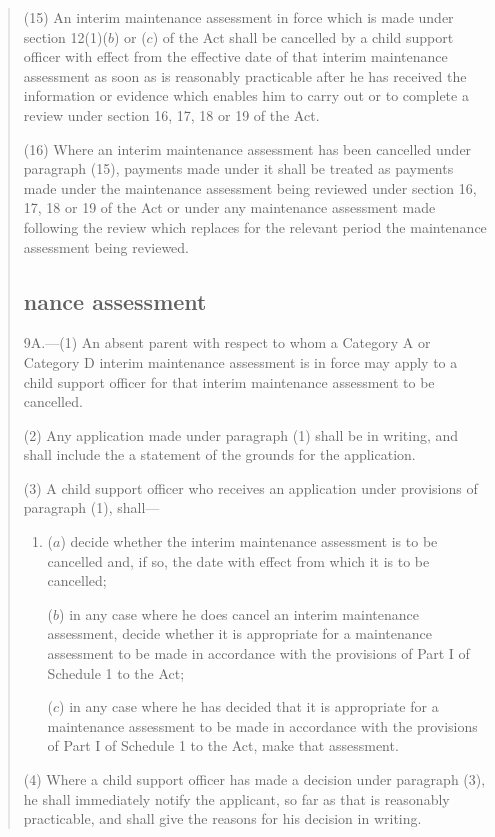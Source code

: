 \documentclass[12pt,a4paper]{article}
\begin{document}
\begin{quotation}
(15) An interim maintenance assessment in force which is made under section 12(1)($b$) or ($c$) of the Act shall be cancelled by a child support officer with effect from the effective date of that interim maintenance assessment as soon as is reasonably practicable after he has received the information or evidence which enables him to carry out or to complete a review under section 16, 17, 18 or 19 of the Act.

(16) Where an interim maintenance assessment has been cancelled under paragraph (15), payments made under it shall be treated as payments made under the maintenance assessment being reviewed under section 16, 17, 18 or 19 of the Act or under any maintenance assessment made following the review which replaces for the relevant period the maintenance assessment being reviewed.

\subsection*{\sloppy {}nance assessment}

9A.—(1) An absent parent with respect to whom a Category A or Category D interim maintenance assessment is in force may apply to a child support officer for that interim maintenance assessment to be cancelled.

(2) Any application made under paragraph (1) shall be in writing, and shall include the a statement of the grounds for the application.

(3) A child support officer who receives an application under provisions of paragraph (1), shall—
\begin{enumerate}\item[]
($a$) decide whether the interim maintenance assessment is to be cancelled and, if so, the date with effect from which it is to be cancelled;

($b$) in any case where he does cancel an interim maintenance assessment, decide whether it is appropriate for a maintenance assessment to be made in accordance with the provisions of Part I of Schedule 1 to the Act;

($c$) in any case where he has decided that it is appropriate for a maintenance assessment to be made in accordance with the provisions of Part I of Schedule 1 to the Act, make that assessment.
\end{enumerate}

(4) Where a child support officer has made a decision under paragraph (3), he shall immediately notify the applicant, so far as that is reasonably practicable, and shall give the reasons for his decision in writing.


\end{quotation}
\end{document}
